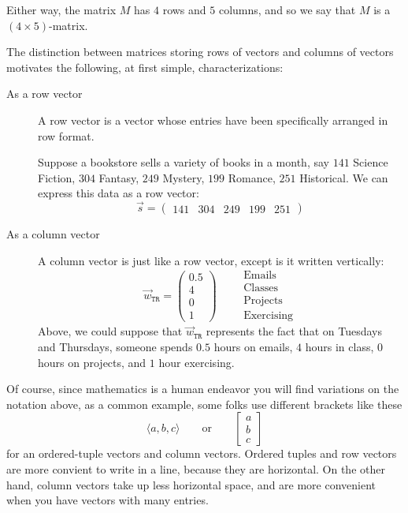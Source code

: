 \documentclass{ximera}
\begin{document}
Either way, the matrix $M$ has $4$ rows and $5$ columns, and so we say that $M$ is a $(4\times 5)$-matrix.


\begin{exploration}

    The distinction between matrices storing rows of vectors and columns of vectors motivates the following, at first simple, characterizations:

    \begin{description}
        \item[As a row vector] A row vector is a vector whose entries have been specifically arranged in row format.
        
        Suppose a bookstore sells a variety of books in a month, say
          $141$ Science Fiction,
          $304$ Fantasy,
          $249$ Mystery,
          $199$ Romance,
          $251$ Historical.
          We can express this data as a row vector:
          \[
          \vec{s} = \begin{pmatrix}141 & 304 & 249 & 199 & 251 \end{pmatrix}
          \]
        \item[As a column vector] A column vector is just like a row vector,
          except is it written vertically:
          \[
          \vec{w}_{\texttt{TR}} = \begin{pmatrix}
            0.5\\ 4 \\ 0 \\ 1\end{pmatrix}
            \qquad
            \begin{array}{l}
            \text{Emails}\\
            \text{Classes}\\
            \text{Projects}\\
            \text{Exercising}
          \end{array}
          \]
          Above, we could suppose that $\vec{w}_{\texttt{TR}}$ represents the
          fact that on Tuesdays and Thursdays, someone spends $0.5$ hours on
          emails, $4$ hours in class, $0$ hours on projects, and $1$ hour
          exercising.
        \end{description}
        
        
        Of course, since mathematics is a human endeavor you will find variations on the notation above, as a common example, some folks use different brackets like these
        \[
        \langle a, b, c\rangle \qquad\text{or}\qquad
        \begin{bmatrix}
          a\\
          b\\
          c
        \end{bmatrix}
        \]
        for an ordered-tuple vectors and column vectors. Ordered tuples and
        row vectors are more convient to write in a line, because they are
        horizontal. On the other hand, column vectors take up less horizontal
        space, and are more convenient when you have vectors with many entries.
        

\end{exploration}
\end{document}
